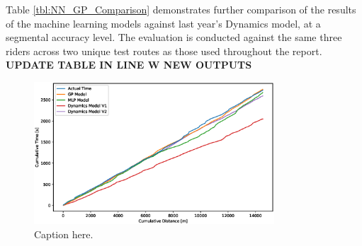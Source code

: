 \documentclass[a4paper, 10pt]{article}
\numberwithin{equation}{section}
\begin{document}
Table \ref{tbl:NN_GP_Comparison} demonstrates further comparison of the results of the machine learning models against last year's Dynamics model, at a segmental accuracy level. The evaluation is conducted against the same three riders across two unique test routes as those used throughout the report. \textbf{UPDATE TABLE IN LINE W NEW OUTPUTS}

\begin{figure}[H]
    \centering
    \includegraphics[width=0.8\textwidth]{images/GP_NN_Compare/GP_NN_Compare.eps}
    \caption{Caption here.}
    \label{fig:ML:NN_GP_Comparison}
\end{figure}
\end{document}
